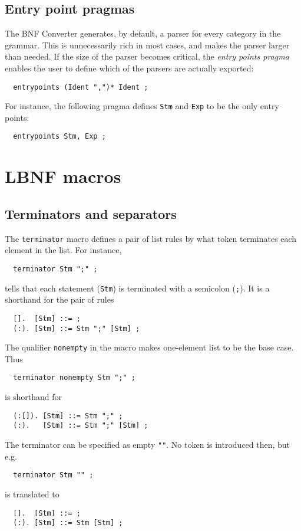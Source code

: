 \documentclass[10pt]{article}
\begin{document}
\subsection{Entry point pragmas}

The BNF Converter generates, by default, a parser for every category in 
the grammar. This is unnecessarily rich in most cases, and makes the parser
larger than needed. If the size of the parser becomes critical,
the \textit{entry points pragma} enables the user 
to define which of the parsers are actually exported:
\begin{verbatim}
  entrypoints (Ident ",")* Ident ;
\end{verbatim}
For instance, the following pragma defines {\tt Stm} and {\tt Exp} to be
the only entry points:
\begin{verbatim}
  entrypoints Stm, Exp ;
\end{verbatim}


\section{LBNF macros}
\label{macros}

\subsection{Terminators and separators}
\label{terminator}

The \verb$terminator$ macro defines a pair of list rules by what
token terminates each element in the list. For instance,
\begin{verbatim}
  terminator Stm ";" ;
\end{verbatim}
tells that each statement (\verb$Stm$) is terminated with a semicolon 
(\verb$;$). It is a shorthand for the pair of rules
\begin{verbatim}
  [].  [Stm] ::= ;
  (:). [Stm] ::= Stm ";" [Stm] ;
\end{verbatim}
The qualifier \verb$nonempty$ in the macro makes one-element list
to be the base case. Thus
\begin{verbatim}
  terminator nonempty Stm ";" ;
\end{verbatim}
is shorthand for
\begin{verbatim}
  (:[]). [Stm] ::= Stm ";" ;
  (:).   [Stm] ::= Stm ";" [Stm] ;
\end{verbatim}
The terminator can be specified as empty \verb$""$. No token is
introduced then, but e.g.
\begin{verbatim}
  terminator Stm "" ;
\end{verbatim}
is translated to
\begin{verbatim}
  [].  [Stm] ::= ;
  (:). [Stm] ::= Stm [Stm] ;
\end{verbatim}
\end{document}
